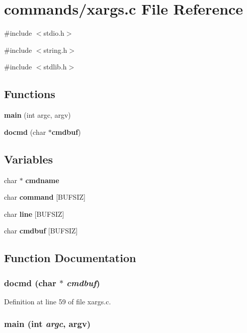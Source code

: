 \section{commands/xargs.c File Reference}
\label{xargs_8c}
{\ttfamily \#include $<$stdio.h$>$}\par
{\ttfamily \#include $<$string.h$>$}\par
{\ttfamily \#include $<$stdlib.h$>$}\par
\subsection*{Functions}
\begin{DoxyCompactItemize}
\item 
{\bf main} (int argc, argv)
\item 
{\bf docmd} (char $\ast${\bf cmdbuf})
\end{DoxyCompactItemize}
\subsection*{Variables}
\begin{DoxyCompactItemize}
\item 
char $\ast$ {\bf cmdname}
\item 
char {\bf command} [BUFSIZ]
\item 
char {\bf line} [BUFSIZ]
\item 
char {\bf cmdbuf} [BUFSIZ]
\end{DoxyCompactItemize}


\subsection{Function Documentation}
\subsubsection[{docmd}]{\setlength{\rightskip}{0pt plus 5cm}docmd (char $\ast$ {\em cmdbuf})}\label{xargs_8c_a0049053ffe9def1ba479eac4ca08100c}


Definition at line 59 of file xargs.c.

\subsubsection[{main}]{\setlength{\rightskip}{0pt plus 5cm}main (int {\em argc}, \/  argv)}\label{xargs_8c_a0708a0954f39ecdc7aa901286295ad01}


